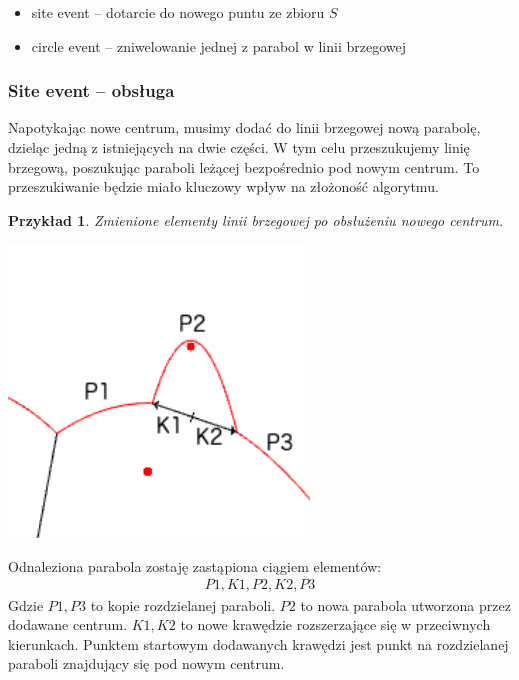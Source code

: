 \documentclass[declaration,shortabstract, inz]{iithesis}
\theoremstyle{definition} \newtheorem{definition}{Definicja}[]
\theoremstyle{plain} \newtheorem{remark}[definition]{Obserwacja}
\theoremstyle{plain} \newtheorem{theorem}[definition]{Twierdzenie}
\theoremstyle{plain} \newtheorem{example}{Przykład}[definition]
\theoremstyle{plain} \newtheorem{lemma}[definition]{Lemat}
\begin{document}
\begin{itemize}
	\item site event -- dotarcie do nowego puntu ze zbioru $S$
	\item circle event -- zniwelowanie jednej z parabol w linii brzegowej
\end{itemize}

\subsubsection{Site event -- obsługa}
\label{sec:site}
Napotykając nowe centrum, musimy dodać do linii brzegowej nową parabolę, dzieląc jedną z istniejących na dwie części. W tym celu przeszukujemy linię brzegową, poszukując paraboli leżącej bezpośrednio pod nowym centrum. To przeszukiwanie będzie miało kluczowy wpływ na złożoność algorytmu. 

\begin{example}
	Zmienione elementy linii brzegowej po obsłużeniu nowego centrum.
	
	\begin{center}
		\includegraphics[width=0.6\textwidth]{ExampleSiteEvent}
	\end{center}
\end{example}

Odnaleziona parabola zostaję zastąpiona ciągiem elementów:
\begin{align}
 	P1, K1, P2, K2, P3
\end{align}
Gdzie $P1, P3$ to kopie rozdzielanej paraboli. $P2$ to nowa parabola utworzona przez dodawane centrum. $K1, K2$ to nowe krawędzie rozszerzające się w przeciwnych kierunkach. Punktem startowym dodawanych krawędzi jest punkt na rozdzielanej paraboli znajdujący się pod nowym centrum.
\end{document}
